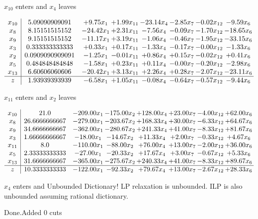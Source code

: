\documentclass[8pt]{article}
\begin{document}
 $ x_{10} $ enters and $ x_{4} $ leaves 

 \[\begin{array}{c| c c@{\hskip 2pt} c@{\hskip 2pt} c@{\hskip 2pt} c@{\hskip 2pt} c@{\hskip 2pt} c@{\hskip 2pt} }
 x_{10}   &  5.09090909091 & +  9.75 x_{1} & +  1.99 x_{11} & -23.14 x_{4} & -2.85 x_{7} & -0.02 x_{12} & -9.59 x_{6}\\
 x_{8}   &  8.15151515152 & -24.42 x_{1} & +  2.31 x_{11} & -7.56 x_{4} & -0.09 x_{7} & -1.70 x_{12} & -18.65 x_{6}\\
 x_{9}   &  9.15151515152 & -11.17 x_{1} & +  3.19 x_{11} & -1.06 x_{4} & -0.46 x_{7} & -1.95 x_{12} & -33.15 x_{6}\\
 x_{3}   &  0.333333333333 & +  0.33 x_{1} & +  0.17 x_{11} & -1.33 x_{4} & -0.17 x_{7} & -0.00 x_{12} & -1.33 x_{6}\\
 x_{2}   &  0.0909090909091 & -1.25 x_{1} & -0.01 x_{11} & +  0.86 x_{4} & +  0.15 x_{7} & -0.02 x_{12} & +  0.41 x_{6}\\
 x_{5}   &  0.484848484848 & -1.58 x_{1} & +  0.23 x_{11} & +  0.11 x_{4} & -0.00 x_{7} & -0.20 x_{12} & -2.98 x_{6}\\
 x_{13}   &  6.60606060606 & -20.42 x_{1} & +  3.13 x_{11} & +  2.26 x_{4} & +  0.28 x_{7} & -2.07 x_{12} & -23.11 x_{6}\\
\hline
z    &  1.93939393939 & -6.58 x_{1} & +  1.05 x_{11} & -0.08 x_{4} & -0.64 x_{7} & -0.57 x_{12} & -9.44 x_{6}\\
\end{array}\]


 $ x_{11} $ enters and $ x_{2} $ leaves 

 \[\begin{array}{c| c c@{\hskip 2pt} c@{\hskip 2pt} c@{\hskip 2pt} c@{\hskip 2pt} c@{\hskip 2pt} c@{\hskip 2pt} }
 x_{10}   &  21.0 & -209.00 x_{1} & -175.00 x_{2} & + 128.00 x_{4} & + 23.00 x_{7} & -4.00 x_{12} & + 62.00 x_{6}\\
 x_{8}   &  26.6666666667 & -279.00 x_{1} & -203.67 x_{2} & + 168.33 x_{4} & + 30.00 x_{7} & -6.33 x_{12} & + 64.67 x_{6}\\
 x_{9}   &  34.6666666667 & -362.00 x_{1} & -280.67 x_{2} & + 241.33 x_{4} & + 41.00 x_{7} & -8.33 x_{12} & + 81.67 x_{6}\\
 x_{3}   &  1.66666666667 & -18.00 x_{1} & -14.67 x_{2} & + 11.33 x_{4} & +  2.00 x_{7} & -0.33 x_{12} & +  4.67 x_{6}\\
 x_{11}   &  8.0 & -110.00 x_{1} & -88.00 x_{2} & + 76.00 x_{4} & + 13.00 x_{7} & -2.00 x_{12} & + 36.00 x_{6}\\
 x_{5}   &  2.33333333333 & -27.00 x_{1} & -20.33 x_{2} & + 17.67 x_{4} & +  3.00 x_{7} & -0.67 x_{12} & +  5.33 x_{6}\\
 x_{13}   &  31.6666666667 & -365.00 x_{1} & -275.67 x_{2} & + 240.33 x_{4} & + 41.00 x_{7} & -8.33 x_{12} & + 89.67 x_{6}\\
\hline
z    &  10.3333333333 & -122.00 x_{1} & -92.33 x_{2} & + 79.67 x_{4} & + 13.00 x_{7} & -2.67 x_{12} & + 28.33 x_{6}\\
\end{array}\]


 $ x_{4} $ enters and Unbounded Dictionary!
 LP relaxation is unbounded. ILP is also unbounded assuming rational dictionary. 

Done.Added 0 cuts 
\end{document}
